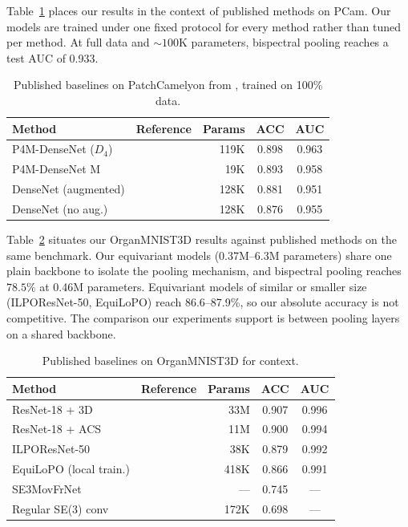 \documentclass{article}
\theoremstyle{definition}
\theoremstyle{remark}
\theoremstyle{definition}
\begin{document}
Table~\ref{tab:pcam-context} places our results in the context of
published methods on PCam. Our models are trained under one fixed
protocol for every method rather than tuned per method. At full data
and ${\sim}100$K parameters, bispectral pooling reaches a test AUC of 0.933.

\begin{table}[h]
  \caption{Published baselines on PatchCamelyon from
    \citet{veeling2018rotation}, trained on 100\% data.}
  \label{tab:pcam-context}
  \centering
  \small
  \begin{tabular}{llrcc}
    \toprule
    Method & Reference & Params & ACC & AUC \\
    \midrule
    P4M-DenseNet ($D_4$)  & \citet{veeling2018rotation} & 119K & 0.898 & 0.963 \\
    P4M-DenseNet M        & \citet{veeling2018rotation} &  19K & 0.893 & 0.958 \\
    DenseNet (augmented)   & \citet{veeling2018rotation} & 128K & 0.881 & 0.951 \\
    DenseNet (no aug.)     & \citet{veeling2018rotation} & 128K & 0.876 & 0.955 \\
    \bottomrule
  \end{tabular}
\end{table}

Table~\ref{tab:organ3d-context} situates our OrganMNIST3D results against published
methods on the same benchmark. Our equivariant models (0.37M--6.3M parameters) share one
plain backbone to isolate the pooling mechanism, and bispectral pooling reaches $78.5\%$ at
0.46M parameters. Equivariant models of similar or smaller size (ILPOResNet-50, EquiLoPO)
reach 86.6--87.9\%, so our absolute accuracy is not competitive. The comparison our experiments
support is between pooling layers on a shared backbone.

\begin{table}[h]
  \caption{Published baselines on OrganMNIST3D for context.}
  \label{tab:organ3d-context}
  \centering
  \small
  \begin{tabular}{llrcc}
    \toprule
    Method & Reference & Params & ACC & AUC \\
    \midrule
    ResNet-18 + 3D           & \citet{medmnistv2} & 33M  & 0.907 & 0.996 \\
    ResNet-18 + ACS          & \citet{medmnistv2} & 11M  & 0.900 & 0.994 \\
    ILPOResNet-50            & \citet{zhemchuzhnikov2024ilponet}       & 38K  & 0.879 & 0.992 \\
    EquiLoPO (local train.)  & \citet{zhemchuzhnikov2025equilopo}      & 418K & 0.866 & 0.991 \\
    SE3MovFrNet              & \citet{sangalli2023movfrnet}     & ---  & 0.745 & ---   \\
    Regular SE(3) conv       & \citet{kuipers2023regular}   & 172K & 0.698 & ---   \\
    \bottomrule
  \end{tabular}
\end{table}
\end{document}
